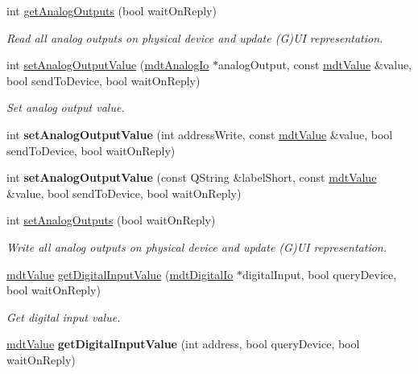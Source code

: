 \begin{DoxyCompactItemize}
\item 
int \hyperlink{classmdt_device_a78a8968cf61c1cac518b0a8af471110c}{getAnalogOutputs} (bool waitOnReply)
\begin{DoxyCompactList}\small\item\em Read all analog outputs on physical device and update (G)UI representation. \end{DoxyCompactList}\item 
int \hyperlink{classmdt_device_a766d9adcf8c2274f61f120a4a5c5c6d9}{setAnalogOutputValue} (\hyperlink{classmdt_analog_io}{mdtAnalogIo} $\ast$analogOutput, const \hyperlink{classmdt_value}{mdtValue} \&value, bool sendToDevice, bool waitOnReply)
\begin{DoxyCompactList}\small\item\em Set analog output value. \end{DoxyCompactList}\item 
\hypertarget{classmdt_device_ab605f81f28271f54570f151e94039807}{
int {\bfseries setAnalogOutputValue} (int addressWrite, const \hyperlink{classmdt_value}{mdtValue} \&value, bool sendToDevice, bool waitOnReply)}
\label{classmdt_device_ab605f81f28271f54570f151e94039807}

\item 
\hypertarget{classmdt_device_a40b49f882622c37f50a57132f954e732}{
int {\bfseries setAnalogOutputValue} (const QString \&labelShort, const \hyperlink{classmdt_value}{mdtValue} \&value, bool sendToDevice, bool waitOnReply)}
\label{classmdt_device_a40b49f882622c37f50a57132f954e732}

\item 
int \hyperlink{classmdt_device_a57e1cee7e670469035c57e3bd2ff4c9d}{setAnalogOutputs} (bool waitOnReply)
\begin{DoxyCompactList}\small\item\em Write all analog outputs on physical device and update (G)UI representation. \end{DoxyCompactList}\item 
\hyperlink{classmdt_value}{mdtValue} \hyperlink{classmdt_device_afe8bd7811ccc4a2ba8088edf073e0a8d}{getDigitalInputValue} (\hyperlink{classmdt_digital_io}{mdtDigitalIo} $\ast$digitalInput, bool queryDevice, bool waitOnReply)
\begin{DoxyCompactList}\small\item\em Get digital input value. \end{DoxyCompactList}\item 
\hypertarget{classmdt_device_a9915b677a307ffeab98a413d61b0f2e7}{
\hyperlink{classmdt_value}{mdtValue} {\bfseries getDigitalInputValue} (int address, bool queryDevice, bool waitOnReply)}
\label{classmdt_device_a9915b677a307ffeab98a413d61b0f2e7}


\end{DoxyCompactItemize}
